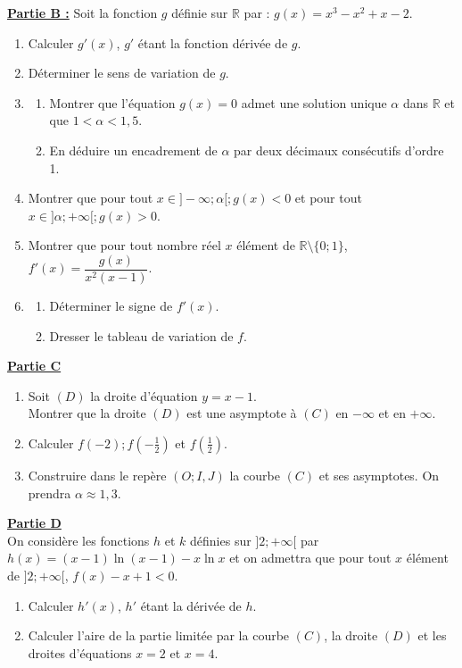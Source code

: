 \documentclass[12pt,a4paper]{article}
\begin{document}
\noindent \underline{\textbf{Partie B :}} Soit la fonction $g$ définie sur $\mathbb{R}$ par : $g(x) = x^3 - x^2 + x - 2$.
\begin{enumerate}
    \item Calculer $g'(x)$, $g'$ étant la fonction dérivée de $g$.
    \item Déterminer le sens de variation de $g$.
    \item \begin{enumerate}
        \item Montrer que l'équation $g(x) = 0$ admet une solution unique $\alpha$ dans $\mathbb{R}$ et que $1 < \alpha < 1,5$.
        \item En déduire un encadrement de $\alpha$ par deux décimaux consécutifs d'ordre 1.
    \end{enumerate}
    \item Montrer que pour tout $x \in ]-\infty; \alpha[ ; g(x) < 0$ et pour tout $x \in ]\alpha; +\infty[ ; g(x) > 0$.
    \item Montrer que pour tout nombre réel $x$ élément de $\mathbb{R} \setminus \{0; 1\}$, $f'(x) = \dfrac{g(x)}{x^2(x-1)}$.
    \item \begin{enumerate}
        \item Déterminer le signe de $f'(x)$.
        \item Dresser le tableau de variation de $f$.
    \end{enumerate}
\end{enumerate}


\noindent \underline{\textbf{Partie C}}
\begin{enumerate}
    \item Soit $(D)$ la droite d'équation $y = x - 1$. \\
    Montrer que la droite $(D)$ est une asymptote à $(C)$ en $-\infty$ et en $+\infty$.
    \item Calculer $f(-2) ; f(-\frac{1}{2})$ et $f(\frac{1}{2})$.
    \item Construire dans le repère $(O; I, J)$ la courbe $(C)$ et ses asymptotes. On prendra $\alpha \approx 1,3$.
\end{enumerate}

\noindent \underline{\textbf{Partie D}}\\
On considère les fonctions $h$ et $k$ définies sur $]2; +\infty[$ par $h(x) = (x - 1) \ln(x - 1) - x \ln x$ et on admettra que pour tout $x$ élément de $]2; +\infty[$, $f(x) - x + 1 < 0$.
\begin{enumerate}
    \item Calculer $h'(x)$, $h'$ étant la dérivée de $h$.
    \item Calculer l'aire de la partie limitée par la courbe $(C)$, la droite $(D)$ et les droites d'équations $x = 2$ et $x = 4$.
\end{enumerate}
\end{document}
